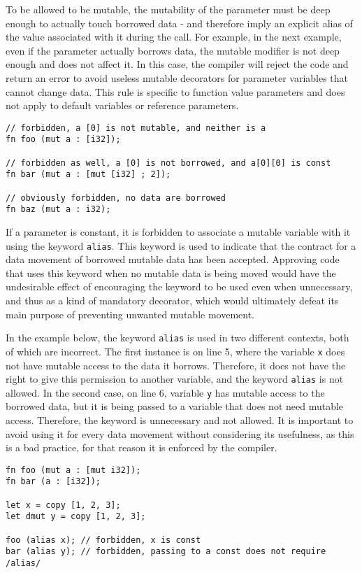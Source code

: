 To be allowed to be mutable, the mutability of the parameter must be deep enough
to actually touch borrowed data - and therefore imply an explicit alias of the
value associated with it during the call. For example, in the next example, even
if the parameter actually borrows data, the mutable modifier is not deep enough
and does not affect it. In this case, the compiler will reject the code and
return an error to avoid useless mutable decorators for parameter variables that
cannot change data. This rule is specific to function value parameters and does
not apply to default variables or reference parameters.

\begin{lstlisting}[style=coloredverbatim]
// forbidden, a [0] is not mutable, and neither is a
fn foo (mut a : [i32]);

// forbidden as well, a [0] is not borrowed, and a[0][0] is const
fn bar (mut a : [mut [i32] ; 2]);

// obviously forbidden, no data are borrowed
fn baz (mut a : i32);
\end{lstlisting}


If a parameter is constant, it is forbidden to associate a mutable variable with it using the keyword \texttt{alias}. This keyword is used to indicate that the contract for a data movement of borrowed mutable data has been accepted. Approving code that uses this keyword when no mutable data is being moved would have the undesirable effect of encouraging the keyword to be used even when unnecessary, and thus as a kind of mandatory decorator, which would ultimately defeat its main purpose of preventing unwanted mutable movement.

In the example below, the keyword \texttt{alias} is used in two different
contexts, both of which are incorrect. The first instance is on line 5, where
the variable \texttt{x} does not have mutable access to the data it borrows.
Therefore, it does not have the right to give this permission to another
variable, and the keyword \texttt{alias} is not allowed. In the second case, on
line 6, variable \texttt{y} has mutable access to the borrowed data, but it is
being passed to a variable that does not need mutable access. Therefore, the
keyword is unnecessary and not allowed. It is important to avoid using it for
every data movement without considering its usefulness, as this is a bad
practice, for that reason it is enforced by the compiler.

\begin{lstlisting}[style=coloredverbatim]
fn foo (mut a : [mut i32]);
fn bar (a : [i32]);

let x = copy [1, 2, 3];
let dmut y = copy [1, 2, 3];

foo (alias x); // forbidden, x is const
bar (alias y); // forbidden, passing to a const does not require /alias/
\end{lstlisting}

